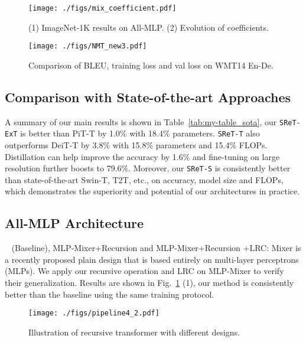 \documentclass[runningheads]{llncs}
\begin{document}
	\begin{figure}[b]
	    \centering \vspace{-0.2in}
		\texttt{[image: ./figs/mix\_coefficient.pdf]}
		\caption{(1) ImageNet-1K results on All-MLP. (2) Evolution of coefficients.}
		\label{fig:mix_coefficients}
	\end{figure}
	
	\begin{figure*}[t]
		\centering
		\texttt{[image: ./figs/NMT\_new3.pdf]}
		\caption{Comparison of BLEU, training loss and val loss on WMT14 En-De.}
		\label{fig:NMT_results}
	\end{figure*}
	
	\subsection{Comparison with State-of-the-art Approaches}
	
	A summary of our main results is shown in Table~\ref{tab:my-table_sota}, our \texttt{SReT-ExT} is better than PiT-T by 1.0\% with 18.4\% parameters. \texttt{SReT-T} also outperforms DeiT-T by 3.8\% with 15.8\% parameters and 15.4\% FLOPs. Distillation can help improve the accuracy by 1.6\% and fine-tuning on large resolution further boosts to 79.6\%. Moreover, our \texttt{SReT-S} is consistently better than state-of-the-art Swin-T, T2T, etc., on accuracy, model size and FLOPs, which demonstrates the superiority and potential of our architectures in practice.
	
	\subsection{All-MLP Architecture}\label{all_mlp_a}
	
	~\cite{tolstikhin2021mlpmixer} (Baseline), MLP-Mixer+Recursion and MLP-Mixer+Recursion +LRC: Mixer is a recently proposed plain design that is based entirely on multi-layer perceptrons (MLPs). We apply our recursive operation and LRC on MLP-Mixer to verify their generalization. Results are shown in Fig.~\ref{fig:mix_coefficients} (1), our method is consistently better than the baseline using the same training protocol.
	
	\begin{figure}[h]
		\centering
		\texttt{[image: ./figs/pipeline4\_2.pdf]} 
		\caption{Illustration of recursive transformer with different designs.}
		\label{fig:pipeline} 
	\end{figure}
	
\end{document}
